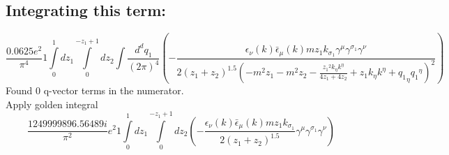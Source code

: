 \subsection*{Integrating this term:}
\begin{dmath}\frac{0.0625 e^{2}}{\pi^{4}}1\int\limits_{ 0 }^{ 1 } d{ z_{ 1 } }\int\limits_{ 0 }^{ - { z_{ 1 } } + 1 } d{ z_{ 2 } }\int\frac{d^d q_1 }{ (2\pi)^4 }\left(- \frac{\epsilon_{ \nu }({ k }) \bar{\epsilon}_{ \mu }({ k }) m { z_{ 1 } } { { k }_{ \sigma_1 } } { \gamma^{ \mu } } { \gamma^{ \sigma_1 } } { \gamma^{ \nu } }}{2 \left({ z_{ 1 } } + { z_{ 2 } }\right)^{1.5} \left(- m^{2} { z_{ 1 } } - m^{2} { z_{ 2 } } - \frac{{ z_{ 1 } }^{2} { { k }_{ \eta } } { { k }^{ \eta } }}{4 { z_{ 1 } } + 4 { z_{ 2 } }} + { z_{ 1 } } { { k }_{ \eta } } { { k }^{ \eta } } + { { q_1 }_{ \eta } } { { q_1 }^{ \eta } }\right)^{2}}\right)\end{dmath}
Found 0 q-vector terms in the numerator.\\
Apply golden integral
\begin{dmath}\frac{1249999896.56489 i}{\pi^{2}} e^{2}1\int\limits_{ 0 }^{ 1 } d{ z_{ 1 } }\int\limits_{ 0 }^{ - { z_{ 1 } } + 1 } d{ z_{ 2 } }\left(- \frac{\epsilon_{ \nu }({ k }) \bar{\epsilon}_{ \mu }({ k }) m { z_{ 1 } } { { k }_{ \sigma_1 } }}{2 \left({ z_{ 1 } } + { z_{ 2 } }\right)^{1.5}} { \gamma^{ \mu } } { \gamma^{ \sigma_1 } } { \gamma^{ \nu } }\right)\end{dmath}

